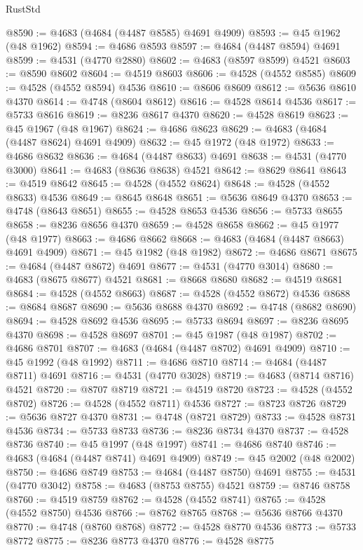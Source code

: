 \begin{lexlean}{RustStd}
\begin{coremodule}
@8590 := @4683 (@4684 (@4487 @8585) @4691 @4909)
@8593 := @45 @1962 (@48 @1962)
@8594 := @4686 @8593
@8597 := @4684 (@4487 @8594) @4691
@8599 := @4531 (@4770 @2880)
@8602 := @4683 (@8597 @8599) @4521
@8603 := @8590 @8602
@8604 := @4519 @8603
@8606 := @4528 (@4552 @8585)
@8609 := @4528 (@4552 @8594) @4536
@8610 := @8606 @8609
@8612 := @5636 @8610 @4370
@8614 := @4748 (@8604 @8612)
@8616 := @4528 @8614 @4536
@8617 := @5733 @8616
@8619 := @8236 @8617 @4370
@8620 := @4528 @8619
@8623 := @45 @1967 (@48 @1967)
@8624 := @4686 @8623
@8629 := @4683 (@4684 (@4487 @8624) @4691 @4909)
@8632 := @45 @1972 (@48 @1972)
@8633 := @4686 @8632
@8636 := @4684 (@4487 @8633) @4691
@8638 := @4531 (@4770 @3000)
@8641 := @4683 (@8636 @8638) @4521
@8642 := @8629 @8641
@8643 := @4519 @8642
@8645 := @4528 (@4552 @8624)
@8648 := @4528 (@4552 @8633) @4536
@8649 := @8645 @8648
@8651 := @5636 @8649 @4370
@8653 := @4748 (@8643 @8651)
@8655 := @4528 @8653 @4536
@8656 := @5733 @8655
@8658 := @8236 @8656 @4370
@8659 := @4528 @8658
@8662 := @45 @1977 (@48 @1977)
@8663 := @4686 @8662
@8668 := @4683 (@4684 (@4487 @8663) @4691 @4909)
@8671 := @45 @1982 (@48 @1982)
@8672 := @4686 @8671
@8675 := @4684 (@4487 @8672) @4691
@8677 := @4531 (@4770 @3014)
@8680 := @4683 (@8675 @8677) @4521
@8681 := @8668 @8680
@8682 := @4519 @8681
@8684 := @4528 (@4552 @8663)
@8687 := @4528 (@4552 @8672) @4536
@8688 := @8684 @8687
@8690 := @5636 @8688 @4370
@8692 := @4748 (@8682 @8690)
@8694 := @4528 @8692 @4536
@8695 := @5733 @8694
@8697 := @8236 @8695 @4370
@8698 := @4528 @8697
@8701 := @45 @1987 (@48 @1987)
@8702 := @4686 @8701
@8707 := @4683 (@4684 (@4487 @8702) @4691 @4909)
@8710 := @45 @1992 (@48 @1992)
@8711 := @4686 @8710
@8714 := @4684 (@4487 @8711) @4691
@8716 := @4531 (@4770 @3028)
@8719 := @4683 (@8714 @8716) @4521
@8720 := @8707 @8719
@8721 := @4519 @8720
@8723 := @4528 (@4552 @8702)
@8726 := @4528 (@4552 @8711) @4536
@8727 := @8723 @8726
@8729 := @5636 @8727 @4370
@8731 := @4748 (@8721 @8729)
@8733 := @4528 @8731 @4536
@8734 := @5733 @8733
@8736 := @8236 @8734 @4370
@8737 := @4528 @8736
@8740 := @45 @1997 (@48 @1997)
@8741 := @4686 @8740
@8746 := @4683 (@4684 (@4487 @8741) @4691 @4909)
@8749 := @45 @2002 (@48 @2002)
@8750 := @4686 @8749
@8753 := @4684 (@4487 @8750) @4691
@8755 := @4531 (@4770 @3042)
@8758 := @4683 (@8753 @8755) @4521
@8759 := @8746 @8758
@8760 := @4519 @8759
@8762 := @4528 (@4552 @8741)
@8765 := @4528 (@4552 @8750) @4536
@8766 := @8762 @8765
@8768 := @5636 @8766 @4370
@8770 := @4748 (@8760 @8768)
@8772 := @4528 @8770 @4536
@8773 := @5733 @8772
@8775 := @8236 @8773 @4370
@8776 := @4528 @8775

\end{coremodule}
\end{lexlean}
